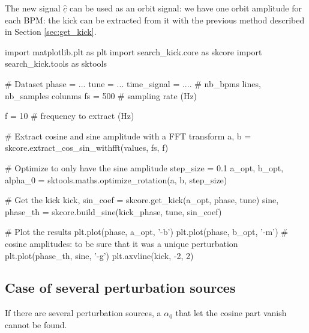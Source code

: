 \documentclass[12pt,a4paper]{article}
\renewcommand{\vec}[1]{\underline{#1}}
\begin{document}
	The new signal $\vec{\hat{c}}$ can be used as an orbit signal: we have one orbit amplitude for each BPM: the kick can be extracted from it with the previous method described in Section \ref{sec:get_kick}.
	
	\begin{python}[caption={Perturbation localisation, f = 10 Hz}]
		import matplotlib.plt as plt
		import search_kick.core as skcore
		import search_kick.tools as sktools
		
		# Dataset
		phase = ...
		tune = ...
		time_signal = ....  # nb_bpms lines, nb_samples colunms
		fs = 500  # sampling rate (Hz)
		
		f = 10  # frequency to extract (Hz)
		
		# Extract cosine and sine amplitude with a FFT transform
		a, b = skcore.extract_cos_sin_withfft(values, fs, f)
	
		# Optimize to only have the sine amplitude
		step_size = 0.1
		a_opt, b_opt, alpha_0 = sktools.maths.optimize_rotation(a, b, step_size)
		
		# Get the kick
		kick, sin_coef = skcore.get_kick(a_opt, phase, tune)
		sine, phase_th = skcore.build_sine(kick_phase, tune, sin_coef)
		
		# Plot the results
		plt.plot(phase, a_opt, '-b')
		plt.plot(phase, b_opt, '-m')  # cosine amplitudes: to be sure that it was a unique perturbation
		plt.plot(phase_th, sine, '-g')
		plt.axvline(kick, -2, 2)

	\end{python}
	
	\subsection{Case of several perturbation sources}
	If there are several perturbation sources, a $\alpha_0$ that let the cosine part vanish cannot be found. 
	
	
	
	
\end{document}
